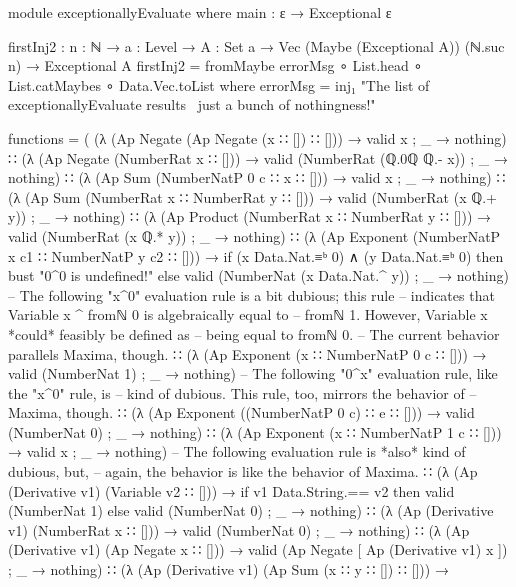 \documentclass{report}
\begin{document}
\begin{code}
module exceptionallyEvaluate where
  main : ε → Exceptional ε

  firstInj2 : {n : ℕ} → {a : Level} → {A : Set a} →
              Vec (Maybe (Exceptional A)) (ℕ.suc n) → Exceptional A
  firstInj2 = fromMaybe errorMsg ∘ List.head ∘ List.catMaybes
            ∘ Data.Vec.toList
    where errorMsg = inj₁ "The list of exceptionallyEvaluate results \
                          \was just a bunch of nothingness!"

  functions =
    ( (λ { (Ap Negate (Ap Negate (x ∷ []) ∷ [])) → valid x
         ; _ → nothing})
    ∷ (λ { (Ap Negate (NumberRat x ∷ [])) → valid (NumberRat (ℚ.0ℚ ℚ.- x))
         ; _ → nothing})
    ∷ (λ { (Ap Sum (NumberNatP 0 c ∷ x ∷ [])) → valid x
         ; _ → nothing})
    ∷ (λ { (Ap Sum (NumberRat x ∷ NumberRat y ∷ [])) →
           valid (NumberRat (x ℚ.+ y))
         ; _ → nothing})
    ∷ (λ { (Ap Product (NumberRat x ∷ NumberRat y ∷ [])) →
           valid (NumberRat (x ℚ.* y))
         ; _ → nothing})
    ∷ (λ { (Ap Exponent (NumberNatP x c1 ∷ NumberNatP y c2 ∷ [])) →
           if (x Data.Nat.≡ᵇ 0) ∧ (y Data.Nat.≡ᵇ 0)
             then bust "0^0 is undefined!"
             else valid (NumberNat (x Data.Nat.^ y))
         ; _ → nothing})
    -- The following "x^0" evaluation rule is a bit dubious; this rule
    -- indicates that Variable x ^ fromℕ 0 is algebraically equal to
    -- fromℕ 1.  However, Variable x *could* feasibly be defined as
    -- being equal to fromℕ 0.
    -- The current behavior parallels Maxima, though.
    ∷ (λ { (Ap Exponent (x ∷ NumberNatP 0 c ∷ [])) → valid (NumberNat 1)
         ; _ → nothing})
    -- The following "0^x" evaluation rule, like the "x^0" rule, is
    -- kind of dubious.  This rule, too, mirrors the behavior of
    -- Maxima, though.
    ∷ (λ { (Ap Exponent ((NumberNatP 0 c) ∷ e ∷ [])) → valid (NumberNat 0)
         ; _ → nothing})
    ∷ (λ { (Ap Exponent (x ∷ NumberNatP 1 c ∷ [])) → valid x
         ; _ → nothing})
    -- The following evaluation rule is *also* kind of dubious, but,
    -- again, the behavior is like the behavior of Maxima.
    ∷ (λ { (Ap (Derivative v1) (Variable v2 ∷ [])) →
           if v1 Data.String.== v2
             then valid (NumberNat 1)
             else valid (NumberNat 0)
         ; _ → nothing})
    ∷ (λ { (Ap (Derivative v1) (NumberRat x ∷ [])) →
           valid (NumberNat 0)
         ; _ → nothing})
    ∷ (λ { (Ap (Derivative v1) (Ap Negate x ∷ [])) →
           valid (Ap Negate [ Ap (Derivative v1) x ])
         ; _ → nothing})
    ∷ (λ { (Ap (Derivative v1) (Ap Sum (x ∷ y ∷ []) ∷ [])) →
}
\end{code}
\end{document}
